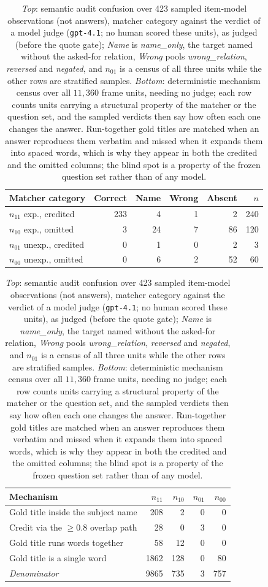 \documentclass[10pt,twocolumn]{article}
\begin{document}
\begin{table}[tb]\centering\footnotesize
\caption{\emph{Top}: semantic audit confusion over 423 sampled item-model observations (not answers),
matcher category against the verdict of a model judge (\texttt{gpt-4.1}; no human scored these units), as
judged (before the quote gate); \emph{Name} is \emph{name\_only}, the target named without the
asked-for relation, \emph{Wrong} pools \emph{wrong\_relation}, \emph{reversed} and
\emph{negated}, and $n_{01}$ is a census of all three units while the other rows are stratified
samples. \emph{Bottom}: deterministic mechanism census over all $11{,}360$ frame units, needing no
judge; each row counts units carrying a structural property of the matcher or the question set, and
the sampled verdicts then say how often each one changes the answer. Run-together gold titles are
matched when an answer reproduces them verbatim and missed when it expands them into spaced words,
which is why they appear in both the credited and the omitted columns; the blind spot is a property
of the frozen question set rather than of any model.}
\label{tab:audit}
\setlength{\tabcolsep}{3.2pt}
\begin{tabular}{lrrrrr}
\toprule
Matcher category & Correct & Name & Wrong & Absent & $n$ \\
\midrule
$n_{11}$ exp., credited   & 233 &  4 & 1 &  2 & 240 \\
$n_{10}$ exp., omitted    &   3 & 24 & 7 & 86 & 120 \\
$n_{01}$ unexp., credited &   0 &  1 & 0 &  2 &   3 \\
$n_{00}$ unexp., omitted  &   0 &  6 & 2 & 52 &  60 \\
\bottomrule
\end{tabular}

\vspace{4pt}
\setlength{\tabcolsep}{3.2pt}
\begin{tabular}{lrrrr}
\toprule
Mechanism & $n_{11}$ & $n_{10}$ & $n_{01}$ & $n_{00}$ \\
\midrule
Gold title inside the subject name & 208 &   2 & 0 &  0 \\
Credit via the $\geq0.8$ overlap path &  28 &   0 & 3 &  0 \\
Gold title runs words together     &  58 &  12 & 0 &  0 \\
Gold title is a single word        & 1862 & 128 & 0 & 80 \\
\midrule
\emph{Denominator}                 & 9865 & 735 & 3 & 757 \\
\bottomrule
\end{tabular}
\end{table}
\end{document}
